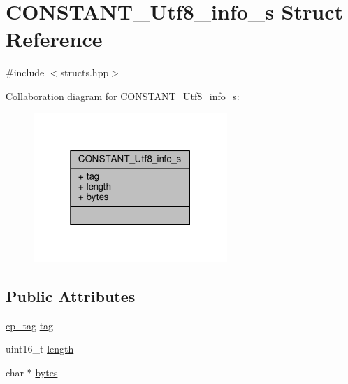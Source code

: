 \hypertarget{structCONSTANT__Utf8__info__s}{\section{C\+O\+N\+S\+T\+A\+N\+T\+\_\+\+Utf8\+\_\+info\+\_\+s Struct Reference}
\label{structCONSTANT__Utf8__info__s}
}


{\ttfamily \#include $<$structs.\+hpp$>$}



Collaboration diagram for C\+O\+N\+S\+T\+A\+N\+T\+\_\+\+Utf8\+\_\+info\+\_\+s\+:\nopagebreak
\begin{figure}[H]
\begin{center}
\leavevmode
\includegraphics[width=208pt]{structCONSTANT__Utf8__info__s__coll__graph}
\end{center}
\end{figure}
\subsection*{Public Attributes}
\begin{DoxyCompactItemize}
\item 
\hyperlink{structs_8hpp_a17947ec3f3c1f2392eabd36c1ba5fec6}{cp\+\_\+tag} \hyperlink{structCONSTANT__Utf8__info__s_a7af843af8dd80fb01a548d38aa7cf649}{tag}
\item 
uint16\+\_\+t \hyperlink{structCONSTANT__Utf8__info__s_a9e45087cd112ac744db73614e4ffef05}{length}
\item 
char $\ast$ \hyperlink{structCONSTANT__Utf8__info__s_a773fbbd37e847eba505fa36f948f3bb5}{bytes}
\end{DoxyCompactItemize}


